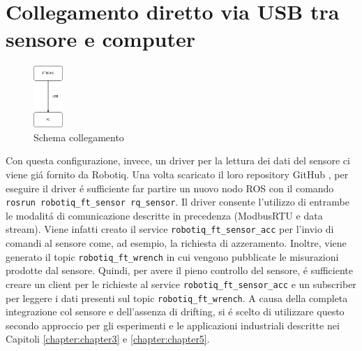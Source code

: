 \section{Collegamento diretto via USB tra sensore e computer}
\begin{figure}[H]
    \centering
    \includegraphics*[width=0.1\textwidth]{images/ft-pc.png}
    \caption{Schema collegamento}
    \label{fig:ft-pc}
\end{figure}
Con questa configurazione, invece, un driver per la lettura dei dati del sensore ci viene gi\'{a} fornito da Robotiq.
Una volta scaricato il loro repository GitHub \cite{robotiq_repo}, per eseguire il driver \'{e} sufficiente far partire 
un nuovo nodo ROS con il comando \verb|rosrun robotiq_ft_sensor rq_sensor|. 
Il driver consente l'utilizzo di entrambe le modalit\'{a} di comunicazione descritte in precedenza (ModbusRTU e data stream).
Viene infatti creato il service \verb|robotiq_ft_sensor_acc| per l'invio di comandi al sensore come, ad esempio, la richiesta 
di azzeramento. Inoltre, viene generato il topic \verb|robotiq_ft_wrench| in cui vengono pubblicate le misurazioni prodotte dal 
sensore. Quindi, per avere il pieno controllo del sensore, \'{e} sufficiente creare un client per le richieste al service 
\verb|robotiq_ft_sensor_acc| e un subscriber per leggere i dati presenti sul topic \verb|robotiq_ft_wrench|. 
A causa della completa integrazione col sensore e dell'assenza di drifting, 
si \'{e} scelto di utilizzare questo secondo approccio per gli esperimenti e le applicazioni industriali descritte nei 
Capitoli \ref{chapter:chapter3} e \ref{chapter:chapter5}.
